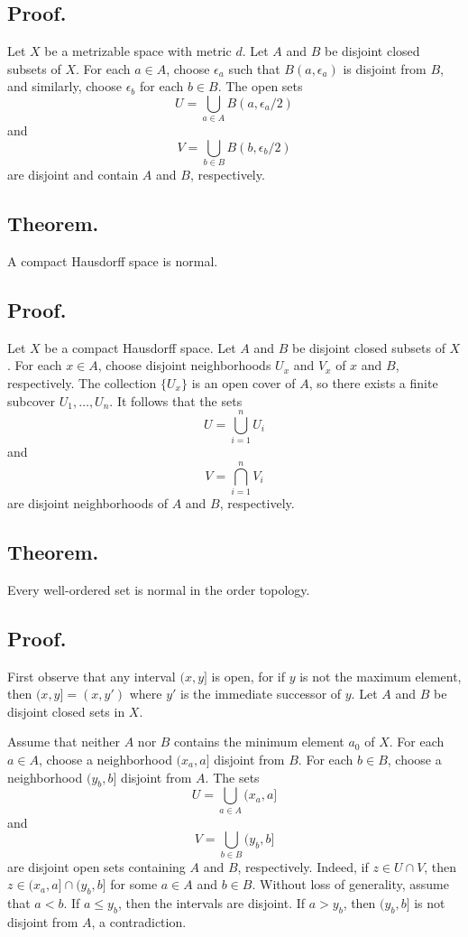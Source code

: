 \documentclass[titlepage]{article}
\begin{document}
\subsection{Proof.} Let $X$ be a metrizable space with metric $d$. Let $A$ and $B$ be disjoint closed subsets of $X$. For each $a \in A$, choose $\epsilon_{a}$ such that $B(a, \epsilon_{a})$ is disjoint from $B$, and similarly, choose $\epsilon_{b}$ for each $b \in B$. The open sets 
$$U = \bigcup_{a \in A} B(a, \epsilon_{a}/2)$$
and 
$$V = \bigcup_{b \in B} B(b, \epsilon_{b}/2)$$
are disjoint and contain $A$ and $B$, respectively.

\subsection{Theorem.} A compact Hausdorff space is normal.

\subsection{Proof.} Let $X$ be a compact Hausdorff space. Let $A$ and $B$ be disjoint closed subsets of $X$. For each $x \in A$, choose disjoint neighborhoods $U_{x}$ and $V_{x}$ of $x$ and $B$, respectively. The collection $\{U_{x}\}$ is an open cover of $A$, so there exists a finite subcover $U_{1}, \ldots, U_{n}$. It follows that the sets 
$$U = \bigcup_{i=1}^{n} U_{i}$$
and 
$$V = \bigcap_{i=1}^{n} V_{i}$$
are disjoint neighborhoods of $A$ and $B$, respectively.

\subsection{Theorem.} Every well-ordered set is normal in the order topology.

\subsection{Proof.} First observe that any interval $(x, y]$ is open, for if $y$ is not the maximum element, then $(x, y] = (x, y')$ where $y'$ is the immediate successor of $y$. Let $A$ and $B$ be disjoint closed sets in $X$.

Assume that neither $A$ nor $B$ contains the minimum element $a_{0}$ of $X$. For each $a \in A$, choose a neighborhood $(x_{a}, a]$ disjoint from $B$. For each $b \in B$, choose a neighborhood $(y_{b}, b]$ disjoint from $A$. The sets
$$U = \bigcup_{a \in A} (x_{a}, a]$$
and 
$$V = \bigcup_{b \in B} (y_{b}, b]$$
are disjoint open sets containing $A$ and $B$, respectively. Indeed, if $z \in U \cap V$, then $z \in (x_{a}, a] \cap (y_{b}, b]$ for some $a \in A$ and $b \in B$. Without loss of generality, assume that $a < b$. If $a \leq y_{b}$, then the intervals are disjoint. If $a > y_{b}$, then $(y_{b}, b]$ is not disjoint from $A$, a contradiction.
\end{document}
